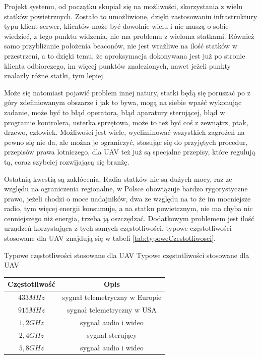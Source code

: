 Projekt systemu, od początku skupiał się na możliwości, skorzystania z wielu statków powietrznych. Zostało to umożliwione, dzięki zastosowaniu infrastruktury typu klient-serwer, klientów może być dowolnie wielu i nie muszą o sobie wiedzieć, z tego punktu widzenia, nie ma problemu z wieloma statkami. Również samo przybliżanie położenia beaconów, nie jest wrażliwe na ilość statków w przestrzeni, a to dzięki temu, że aproksymacja dokonywana jest już po stronie klienta odbiorczego, im więcej punktów znalezionych, nawet jeżeli punkty znalazły różne statki, tym lepiej.

Może się natomiast pojawić problem innej natury, statki będą się poruszać po z góry zdefiniowanym obszarze i jak to bywa, mogą na siebie wpaść wykonując zadanie, może być to błąd operatora, błąd aparatury sterującej, błąd w programie kontrolera, usterka sprzętowa, może to też być coś z zewnątrz, ptak, drzewo, człowiek. Możliwości jest wiele, wyeliminować wszystkich zagrożeń na pewno się nie da, ale można je ograniczyć, stosując się do przyjętych procedur, przepisów prawa lotniczego, dla UAV też już są specjalne przepisy, które regulują tą, coraz szybciej rozwijającą się branżę.

Ostatnią kwestią są zakłócenia. Radia statków nie są dużych mocy, raz ze względu na ograniczenia regionalne, w Polsce obowiązuje bardzo rygorystyczne prawo, jeżeli chodzi o moce nadajników, dwa ze względu na to że im mocniejsze radio, tym więcej energii konsumuje, a na statku powietrznym, nie ma chyba nic cenniejszego niż energia, trzeba ją oszczędzać. Dodatkowym problemem jest ilość urządzeń korzystająca z tych samych częstotliwości, typowe częstotliwości stosowane dla UAV znajdują się w tabeli \ref{tab:typoweCzestotliwosci}.
\begin{tablica}
    {Typowe częstotliwości stosowane dla UAV}
    {Typowe częstotliwości stosowane dla UAV}
    {
    \begin{tabular}{|c|c|} \hline
        Częstotliwość & Opis \\ \hline
        $433 MHz$  & sygnał telemetryczny w Europie \\ \hline
        $915 MHz$  & sygnał telemetryczny w USA \\ \hline
        $1,2 GHz$  & sygnał audio i wideo \\ \hline
        $2,4 GHz$  & sygnał sterujący \\ \hline
        $5,8 GHz$  & sygnał audio i wideo \\ \hline
   \end{tabular}
    }
    \label{tab:typoweCzestotliwosci}
\end{tablica}

